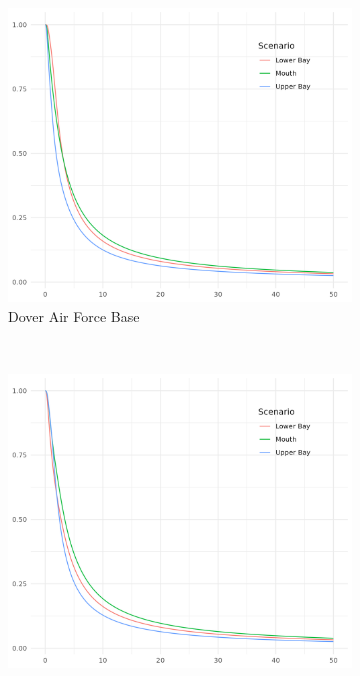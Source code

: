 \begin{figure}[htb]
    \begin{subfigure}[t]{0.31\textwidth}
        \centering
        \includegraphics[width=0.99\linewidth]{./plots/condsurv/doverafb}
        \caption{Dover Air Force Base\label{fig:condsurv1d:doverafb}}
    \end{subfigure}%
    ~ 
    \begin{subfigure}[t]{0.31\textwidth}
        \centering
        \includegraphics[width=0.99\linewidth]{./plots/condsurv/pia}

\end{subfigure}
\end{figure}
